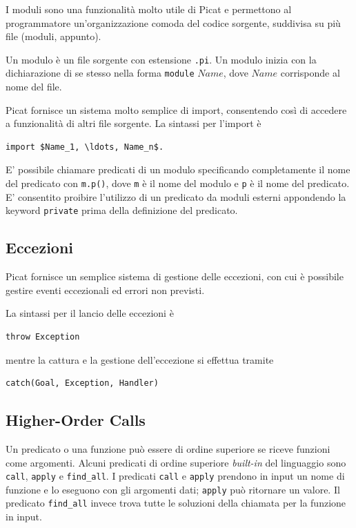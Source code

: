\documentclass[12pt,a4paper,openright]{book} %
\begin{document}
I moduli sono una funzionalità molto utile di Picat e permettono al programmatore un'organizzazione comoda del codice sorgente, suddivisa su più file (moduli, appunto).

Un modulo è un file sorgente con estensione \verb|.pi|. Un modulo inizia con la dichiarazione di se stesso nella forma \verb|module| $Name$, dove $Name$ corrisponde al nome del file.

Picat fornisce un sistema molto semplice di import, consentendo così di accedere a funzionalità di altri file sorgente. La sintassi per l'import è 
\begin{lstlisting}
import $Name_1, \ldots, Name_n$.
\end{lstlisting}

E' possibile chiamare predicati di un modulo specificando completamente il nome del predicato con \verb|m.p()|, dove \verb|m| è il nome del modulo e \verb|p| è il nome del predicato. E' consentito proibire l'utilizzo di un predicato da moduli esterni appondendo la keyword \verb|private| prima della definizione del predicato.

\subsection{Eccezioni}
\label{sec:picat_advanced_exceptions}

Picat fornisce un semplice sistema di gestione delle eccezioni, con cui è possibile gestire eventi eccezionali ed errori non previsti.

La sintassi per il lancio delle eccezioni è 
\begin{lstlisting}
throw Exception
\end{lstlisting}
mentre la cattura e la gestione dell'eccezione si effettua tramite
\begin{lstlisting}
catch(Goal, Exception, Handler)
\end{lstlisting}

\subsection{Higher-Order Calls}
\label{sec:picat_advanced_hoc}

Un predicato o una funzione può essere di ordine superiore se riceve funzioni come argomenti. Alcuni predicati di ordine superiore \emph{built-in} del linguaggio sono \verb|call|, \verb|apply| e \verb|find_all|. I predicati \verb|call| e \verb|apply| prendono in input un nome di funzione e lo eseguono con gli argomenti dati; \verb|apply| può ritornare un valore. Il predicato \verb|find_all| invece trova tutte le soluzioni della chiamata per la funzione in input.
\end{document}
